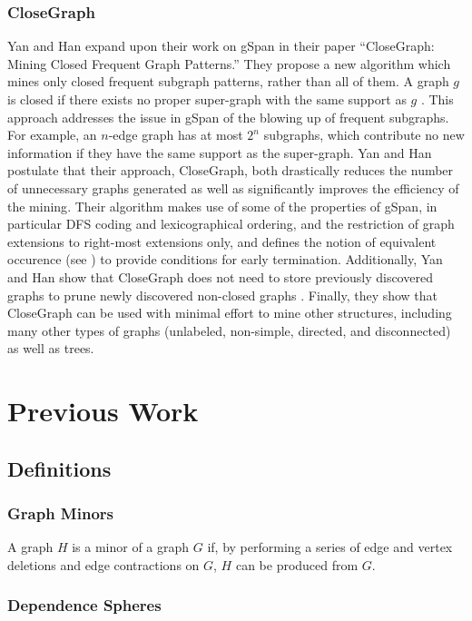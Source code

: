 \documentclass[12pt]{article}
\begin{document}
\subsubsection{CloseGraph}
Yan and Han expand upon their work on gSpan in their paper
``CloseGraph: Mining Closed Frequent Graph Patterns.'' They propose a new
algorithm which mines only closed frequent subgraph patterns, rather than all
of them. A graph $g$ is closed if there exists no proper super-graph with the
same support as $g$ \cite{Yan:2003:CMC:956750.956784}. This approach addresses
the issue in gSpan of the blowing up of frequent subgraphs. For example, an
$n$-edge graph has at most $2^n$ subgraphs, which contribute no new
information if they have the same support as the super-graph. Yan and Han
postulate that their approach, CloseGraph, both drastically reduces the number
of unnecessary graphs generated as well as significantly improves the
efficiency of the mining\cite{Yan:2003:CMC:956750.956784}. Their algorithm
makes use of some of the properties of gSpan, in particular DFS coding and
lexicographical ordering, and the restriction of graph extensions to right-most
extensions only, and defines the notion of equivalent occurence (see
\cite{Yan:2003:CMC:956750.956784}) to provide conditions for early
termination. Additionally, Yan and Han show that CloseGraph does not need to
store previously discovered graphs to prune newly discovered non-closed graphs
\cite{Yan:2003:CMC:956750.956784}. Finally, they show that CloseGraph can be
used with minimal effort to mine other structures, including many other types
of graphs (unlabeled, non-simple, directed, and disconnected) as well as trees.
\\

\section{Previous Work}
\subsection{Definitions}
\subsubsection{Graph Minors}
A graph $H$ is a minor of a graph $G$ if, by performing a series of edge and
vertex deletions and edge contractions on $G$, $H$ can be produced from $G$.

\subsubsection{Dependence Spheres}
\end{document}
